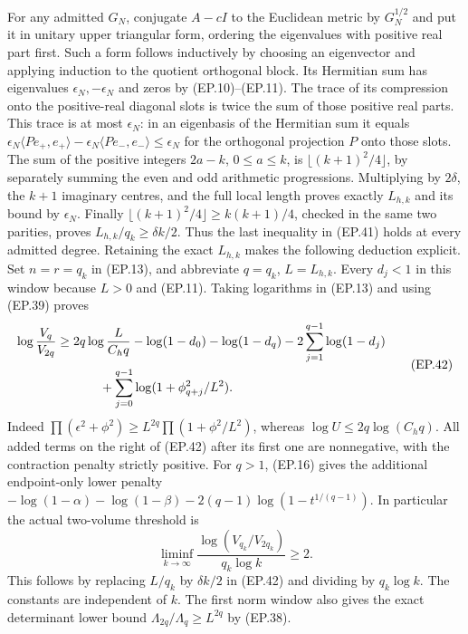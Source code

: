 For any admitted $G_N$, conjugate $A-cI$ to the Euclidean metric
by $G_N^{1/2}$ and put it in unitary upper triangular form, ordering
the eigenvalues with positive real part first. Such a form follows
inductively by choosing an eigenvector and applying induction to
the quotient orthogonal block. Its Hermitian sum has eigenvalues
$\epsilon_N,-\epsilon_N$ and zeros by (EP.10)--(EP.11).
The trace of its compression onto the positive-real diagonal slots
is twice the sum of those positive real parts. This trace is at
most $\epsilon_N$: in an eigenbasis of the Hermitian sum it equals
$\epsilon_N\langle P e_+,e_+\rangle
-\epsilon_N\langle P e_-,e_-\rangle\le\epsilon_N$ for the
orthogonal projection $P$ onto those slots.
The sum of the positive integers $2a-k$, $0\le a\le k$, is
$\lfloor(k+1)^2/4\rfloor$, by separately summing the even and odd
arithmetic progressions. Multiplying by $2\delta$, the $k+1$
imaginary centres, and the full local length proves exactly $L_{h,k}$
and its bound by $\epsilon_N$. Finally
$\lfloor(k+1)^2/4\rfloor\ge k(k+1)/4$, checked in the same two
parities, proves $L_{h,k}/q_k\ge\delta k/2$.
Thus the last inequality in (EP.41) holds at every admitted degree. Retaining the
exact $L_{h,k}$ makes the following deduction explicit. Set $n=r=q_k$
in (EP.13), and abbreviate $q=q_k$, $L=L_{h,k}$.
Every $d_j<1$ in this window because $L>0$ and (EP.11).
Taking logarithms in (EP.13) and using (EP.39) proves
\[
 \begin{split}
 \log\frac{V_q}{V_{2q}}
 &\ge2q\log\frac{L}{C_hq}
 -\log(1-d_0)-\log(1-d_q)-2\sum_{j=1}^{q-1}\log(1-d_j)\\
 &\hspace{12mm}+\sum_{j=0}^{q-1}\log(1+\phi_{q+j}^2/L^2).
 \end{split}\tag{EP.42}
\]
Indeed $\prod(\epsilon^2+\phi^2)\ge
L^{2q}\prod(1+\phi^2/L^2)$, whereas
$\log U\le2q\log(C_hq)$. All added terms on the right of
(EP.42) after its first one are nonnegative, with the contraction
penalty strictly positive. For $q>1$, (EP.16) gives the additional
endpoint-only lower penalty
$-\log(1-\alpha)-\log(1-\beta)
-2(q-1)\log(1-t^{1/(q-1)})$.
In particular the actual two-volume threshold is
\[
 \boxed{\liminf_{k\to\infty}
 \frac{\log(V_{q_k}/V_{2q_k})}{q_k\log k}\ge2.}\tag{EP.43}
\]
This follows by replacing $L/q_k$ by $\delta k/2$ in (EP.42)
and dividing by $q_k\log k$. The constants are independent of $k$.
The first norm window also gives the exact determinant lower bound
$\Lambda_{2q}/\Lambda_q\ge L^{2q}$ by (EP.38).


